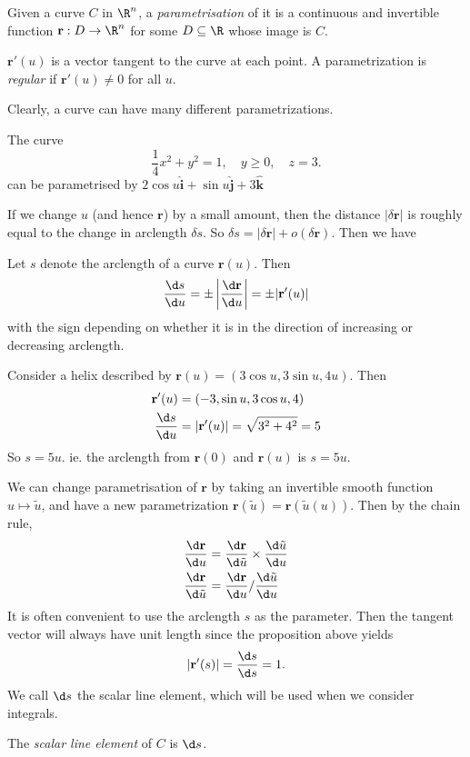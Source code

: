 \documentclass[a4paper]{article}
\begin{document}
\begin{defi}
  Given a curve $C$ in $\R^n$, a \emph{parametrisation} of it is a continuous and invertible function $\mathbf{r}: D\to \R^n$ for some $D\subseteq \R$ whose image is $C$.

  $\mathbf{r}'(u)$ is a vector tangent to the curve at each point. A parametrization is \emph{regular} if $\mathbf{r}'(u) \not= 0$ for all $u$.
\end{defi}
Clearly, a curve can have many different parametrizations.

\begin{eg}
  The curve
  \[
    \frac{1}{4}x^2 + y^2 = 1, \quad y \geq 0, \quad z = 3.
  \]
  can be parametrised by $2\cos u\hat{\mathbf{i}} + \sin u\hat{\mathbf{j}} + 3\hat{\mathbf{k}}$
\end{eg}
If we change $u$ (and hence $\mathbf{r}$) by a small amount, then the distance $|\delta \mathbf{r}|$ is roughly equal to the change in arclength $\delta s$. So $\delta s = |\delta \mathbf{r}| + o(\delta \mathbf{r})$. Then we have

\begin{prop}
  Let $s$ denote the arclength of a curve $\mathbf{r}(u)$. Then
  \[
    \frac{\d s}{\d u} = \pm \left|\frac{\d \mathbf{r}}{\d u}\right| = \pm |\mathbf{r}'(u)|
  \]
  with the sign depending on whether it is in the direction of increasing or decreasing arclength.
\end{prop}

\begin{eg}
  Consider a helix described by $\mathbf{r}(u) = (3\cos u, 3\sin u, 4u)$. Then
  \begin{align*}
    \mathbf{r}'(u) &= (-3,\sin u, 3\cos u, 4)\\
    \frac{\d s}{\d u} &= |\mathbf{r}'(u)| = \sqrt{3^2 + 4^2} = 5
  \end{align*}
  So $s = 5u$. ie. the arclength from $\mathbf{r}(0)$ and $\mathbf{r}(u)$ is $s = 5u$.
\end{eg}

We can change parametrisation of $\mathbf{r}$ by taking an invertible smooth function $u\mapsto \tilde{u}$, and have a new parametrization $\mathbf{r}(\tilde{u}) = \mathbf{r}(\tilde{u}(u))$. Then by the chain rule,
\begin{align*}
  \frac{\d \mathbf{r}}{\d u} &= \frac{\d \mathbf{r}}{\d \tilde{u}}\times \frac{\d \tilde{u}}{\d u}\\
  \frac{\d \mathbf{r}}{\d \tilde{u}} &= \frac{\d \mathbf{r}}{\d u}/ \frac{\d \tilde{u}}{\d u}
\end{align*}
It is often convenient to use the arclength $s$ as the parameter. Then the tangent vector will always have unit length since the proposition above yields
\[
  |\mathbf{r}'(s)| = \frac{\d s}{\d s} = 1.
\]
We call $\d s$ the scalar line element, which will be used when we consider integrals.
\begin{defi}
  The \emph{scalar line element} of $C$ is $\d s$.
\end{defi}
\end{document}
